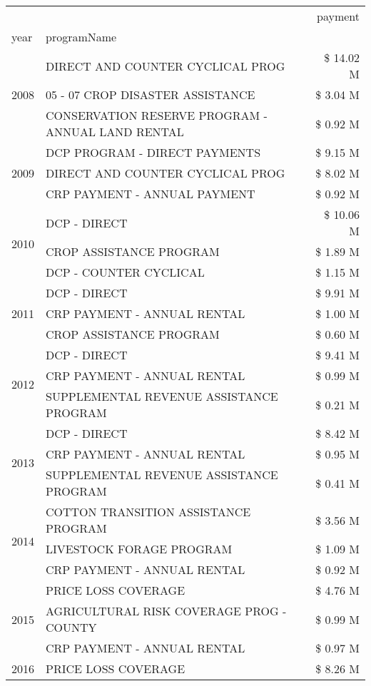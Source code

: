 \begin{tabular}{llr}
\toprule
 &  & payment \\
year & programName &  \\
\midrule
\multirow[t]{3}{*}{2008} & DIRECT AND COUNTER CYCLICAL PROG & \$ 14.02 M \\
 & 05 - 07 CROP DISASTER ASSISTANCE & \$ 3.04 M \\
 & CONSERVATION RESERVE PROGRAM - ANNUAL LAND RENTAL & \$ 0.92 M \\
\cline{1-3}
\multirow[t]{3}{*}{2009} & DCP PROGRAM - DIRECT PAYMENTS & \$ 9.15 M \\
 & DIRECT AND COUNTER CYCLICAL PROG & \$ 8.02 M \\
 & CRP PAYMENT - ANNUAL PAYMENT & \$ 0.92 M \\
\cline{1-3}
\multirow[t]{3}{*}{2010} & DCP - DIRECT & \$ 10.06 M \\
 & CROP ASSISTANCE PROGRAM & \$ 1.89 M \\
 & DCP - COUNTER CYCLICAL & \$ 1.15 M \\
\cline{1-3}
\multirow[t]{3}{*}{2011} & DCP - DIRECT & \$ 9.91 M \\
 & CRP PAYMENT - ANNUAL RENTAL & \$ 1.00 M \\
 & CROP ASSISTANCE PROGRAM & \$ 0.60 M \\
\cline{1-3}
\multirow[t]{3}{*}{2012} & DCP - DIRECT & \$ 9.41 M \\
 & CRP PAYMENT - ANNUAL RENTAL & \$ 0.99 M \\
 & SUPPLEMENTAL REVENUE ASSISTANCE PROGRAM & \$ 0.21 M \\
\cline{1-3}
\multirow[t]{3}{*}{2013} & DCP - DIRECT & \$ 8.42 M \\
 & CRP PAYMENT - ANNUAL RENTAL & \$ 0.95 M \\
 & SUPPLEMENTAL REVENUE ASSISTANCE PROGRAM & \$ 0.41 M \\
\cline{1-3}
\multirow[t]{3}{*}{2014} & COTTON TRANSITION ASSISTANCE PROGRAM & \$ 3.56 M \\
 & LIVESTOCK FORAGE PROGRAM & \$ 1.09 M \\
 & CRP PAYMENT - ANNUAL RENTAL & \$ 0.92 M \\
\cline{1-3}
\multirow[t]{3}{*}{2015} & PRICE LOSS COVERAGE & \$ 4.76 M \\
 & AGRICULTURAL RISK COVERAGE PROG - COUNTY & \$ 0.99 M \\
 & CRP PAYMENT - ANNUAL RENTAL & \$ 0.97 M \\
\cline{1-3}
\multirow[t]{3}{*}{2016} & PRICE LOSS COVERAGE & \$ 8.26 M \\

\end{tabular}
